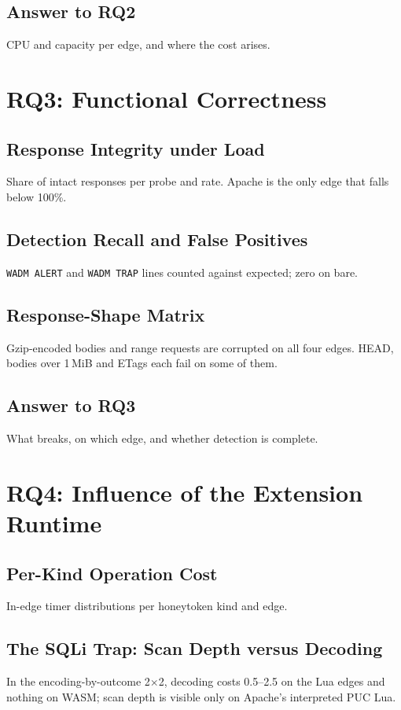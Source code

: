 \documentclass{rptuma}
\begin{document}
\subsection{Answer to RQ2}
CPU and capacity per edge, and where the cost arises.

\section{RQ3: Functional Correctness}
\subsection{Response Integrity under Load}
Share of intact responses per probe and rate. Apache is the only edge that falls below 100\%.
\subsection{Detection Recall and False Positives}
\texttt{WADM ALERT} and \texttt{WADM TRAP} lines counted against expected; zero on bare.
\subsection{Response-Shape Matrix}
Gzip-encoded bodies and range requests are corrupted on all four edges. HEAD, bodies over 1\,MiB
and ETags each fail on some of them.
\subsection{Answer to RQ3}
What breaks, on which edge, and whether detection is complete.

\section{RQ4: Influence of the Extension Runtime}
\subsection{Per-Kind Operation Cost}
In-edge timer distributions per honeytoken kind and edge.
\subsection{The SQLi Trap: Scan Depth versus Decoding}
In the encoding-by-outcome 2$\times$2, decoding costs 0.5--2.5\us{} on the Lua edges and nothing
on WASM; scan depth is visible only on Apache's interpreted PUC Lua.
\end{document}
